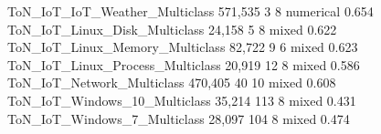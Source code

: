 ToN_IoT_IoT_Weather_Multiclass                                          571,535        3       8     numerical   0.654
ToN_IoT_Linux_Disk_Multiclass                                            24,158        5       8         mixed   0.622
ToN_IoT_Linux_Memory_Multiclass                                          82,722        9       6         mixed   0.623
ToN_IoT_Linux_Process_Multiclass                                         20,919       12       8         mixed   0.586
ToN_IoT_Network_Multiclass                                              470,405       40      10         mixed   0.608
ToN_IoT_Windows_10_Multiclass                                            35,214      113       8         mixed   0.431
ToN_IoT_Windows_7_Multiclass                                             28,097      104       8         mixed   0.474